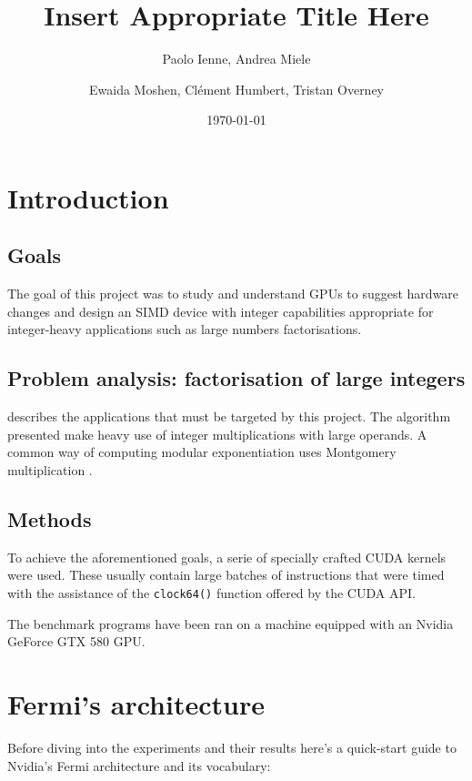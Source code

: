 \documentclass{report}
\begin{document}
\title{Insert Appropriate Title Here}
\author{Paolo Ienne, Andrea Miele\and Ewaida Moshen, Cl\'{e}ment Humbert, Tristan Overney}
\date{\today}
\maketitle

\tableofcontents
\listoffigures

\chapter{Introduction}
\section{Goals}
	The goal of this project was to study and understand GPUs to suggest hardware
    changes and design an SIMD device with integer capabilities appropriate for
    integer-heavy applications such as large numbers factorisations.

\section{Problem analysis: factorisation of large integers}
    \cite{cofact14} describes the applications that must be targeted by this project.
    The algorithm presented make heavy use of integer multiplications with large 
    operands. A common way of computing modular exponentiation uses Montgomery 
    multiplication \cite{montgom90}.

\section{Methods}
	To achieve the aforementioned goals, a serie of specially crafted CUDA kernels
	were used. These usually contain large batches of instructions that were 
	timed with the assistance of the \texttt{clock64()} function offered by the CUDA API.

	The benchmark programs have been ran on a machine equipped with an Nvidia
    GeForce GTX 580 GPU.

\chapter{Fermi's architecture}
    Before diving into the experiments and their results here's a quick-start
    guide to Nvidia's Fermi architecture and its vocabulary:
\end{document}
